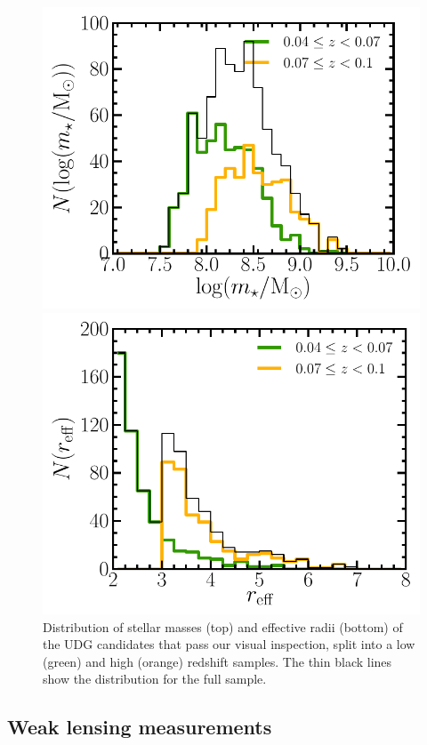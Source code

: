 \documentclass[usenatbib,fleqn]{mnras}
\begin{document}
\begin{figure}
 \centerline{\includegraphics[width=0.8\linewidth]{logmstar_redshift.pdf}}
 \centerline{\includegraphics[width=0.8\linewidth]{reff_redshift.pdf}}
\caption{Distribution of stellar masses (top) and effective radii (bottom) of the UDG candidates that pass our visual inspection, split into a low (green) and high (orange) redshift samples. The thin black lines show the distribution for the full sample.}
\label{f:hist}
\end{figure}


\subsection{Weak lensing measurements}
\end{document}

